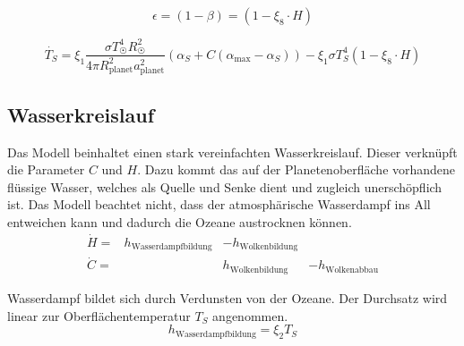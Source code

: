 \begin{refsection}
\begin{equation}
\epsilon  = (1 - \beta) = (1 - \xi_8 \cdot H)
\end{equation}

\begin{equation}
\dot{T_S} = \xi_1 \frac{\sigma T_{\astrosun}^4 R_{\astrosun}^2}{4 \pi R_{\text{planet}}^2 a_{\text{planet}}^2} (\alpha_S + C(\alpha_{\text{max}} - \alpha_S)) - \xi_1 \sigma T_{S}^4  (1 - \xi_8 \cdot H)
\end{equation}

\subsection{Wasserkreislauf}

Das Modell beinhaltet einen stark vereinfachten Wasserkreislauf.
Dieser verknüpft die Parameter $C$ und $H$.
Dazu kommt das auf der Planetenoberfläche vorhandene flüssige Wasser, welches als Quelle und Senke dient und zugleich unerschöpflich ist. Das Modell beachtet nicht, dass der atmosphärische Wasserdampf ins All entweichen kann und dadurch die Ozeane austrocknen können.
\begin{equation}
\begin{matrix}
\dot{H}   = & h_{\text{Wasserdampfbildung}} & - h_{\text{Wolkenbildung}}   &                      \\
\dot{C}   = &                     		    &   h_{\text{Wolkenbildung}}   & - h_{\text{Wolkenabbau}}
\end{matrix}
\end{equation}

Wasserdampf bildet sich durch Verdunsten von der Ozeane. Der Durchsatz wird linear zur Oberflächentemperatur $T_S$ angenommen.
\begin{equation}
h_{\text{Wasserdampfbildung}} = \xi_2 T_S
\end{equation}



\end{refsection}
